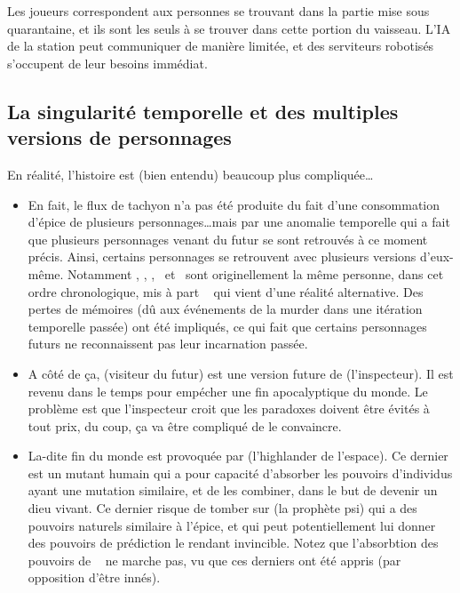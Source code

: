 {	\par Les joueurs correspondent aux personnes se trouvant dans la partie mise sous quarantaine, et ils sont les seuls à se trouver dans cette portion du vaisseau. L'IA de la station peut communiquer de manière limitée, et des serviteurs robotisés s'occupent de leur besoins immédiat.
	
	\subsection{La singularité temporelle et des multiples versions de personnages}
	
	\par En réalité, l'histoire est (bien entendu) beaucoup plus compliquée\dots
	\begin{itemize}
		\item En fait, le flux de tachyon n'a pas été produite du fait d'une consommation d'épice de plusieurs personnages\dots mais par une anomalie temporelle qui a fait que plusieurs personnages venant du futur se sont retrouvés à ce moment précis. Ainsi, certains personnages se retrouvent avec plusieurs versions d'eux-même. Notamment \nmPlayerI, \nmPlayerII, \nmPlayerIII, \nmPlayerIV ~et \nmPlayerVI ~sont originellement la même personne, dans cet ordre chronologique, mis à part \nmPlayerVI ~ qui vient d'une réalité alternative. Des pertes de mémoires (dû aux événements de la murder dans une itération temporelle passée) ont été impliqués, ce qui fait que certains personnages futurs ne reconnaissent pas leur incarnation passée.
		
		\item A côté de ça, \nmPlayerV (visiteur du futur) est une version future de \nmPlayerVII (l'inspecteur). Il est revenu dans le temps pour empécher une fin apocalyptique du monde. Le problème est que l'inspecteur croit que les paradoxes doivent être évités à tout prix, du coup, ça va être compliqué de le convaincre.
		
		\item La-dite fin du monde est provoquée par \nmPlayerX (l'highlander de l'espace). Ce dernier est un mutant humain qui a pour capacité d'absorber les pouvoirs d'individus ayant une mutation similaire, et de les combiner, dans le but de devenir un dieu vivant. Ce dernier risque de tomber sur \nmPlayerIX (la prophète psi) qui a des pouvoirs naturels similaire à l'épice, et qui peut potentiellement lui donner des pouvoirs de prédiction le rendant invincible. Notez que l'absorbtion des pouvoirs de \nmPlayerVI ~ ne marche pas, vu que ces derniers ont été appris (par opposition d'être innés).
		

\end{itemize}}
